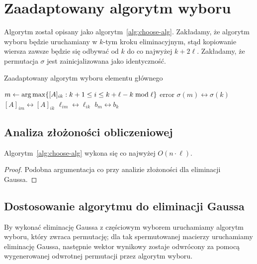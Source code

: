 \documentclass[../main.tex]{subfiles}
\begin{document}
  \section{Zaadaptowany algorytm wyboru}
  Algorytm został opisany jako algorytm~\ref{alg:choose-alg}.
  Zakładamy, że algorytm wyboru będzie uruchamiany w \( k \)-tym kroku
  eliminacyjnym, stąd kopiowanie wiersza zawsze będzie się odbywać
  od \( k \) do co najwyżej \( k + 2 \ell \). Zakładamy, że permutacja
  \( \sigma \) jest zainicjalizowana jako identyczność.
  \begin{algorithm}
    \caption{Zaadaptowany algorytm wyboru elementu głównego}
    \label{alg:choose-alg}
    \begin{algorithmic}[1]
          \State $m \gets \operatorname*{arg\,max} \{ [A]_{ik} : k + 1 \le i \le k + \ell - k \bmod \ell \}$ 
            \State \Return error
          \Else
            \State $\sigma(m) \leftrightarrow \sigma(k)$
             
              \State $[A]_{im} \leftrightarrow [A]_{ik}$
              \State $\ell_{im} \leftrightarrow \ell_{ik}$
            \EndFor
            \State $b_m \leftrightarrow b_k$ 
          \EndIf
      \EndProcedure
    \end{algorithmic}
  \end{algorithm}

  \subsection{Analiza złożoności obliczeniowej}
  
  \begin{fact}
    Algorytm~\ref{alg:choose-alg} wykona się co najwyżej \( O(n \cdot \ell) \).
  \end{fact}
  \begin{proof}
    Podobna argumentacja co przy analizie złożoności dla eliminacji Gaussa.
  \end{proof}

  \subsection{Dostosowanie algorytmu do eliminacji Gaussa}
  By wykonać eliminację Gaussa z częściowym wyborem uruchamiamy
  algorytm wyboru, który zwraca permutację; dla tak spermutowanej
  macierzy uruchamiamy eliminację Gaussa, następnie wektor wynikowy
  zostaje odwrócony za pomocą wygenerowanej odwrotnej permutacji
  przez algorytm wyboru.
\end{document}
